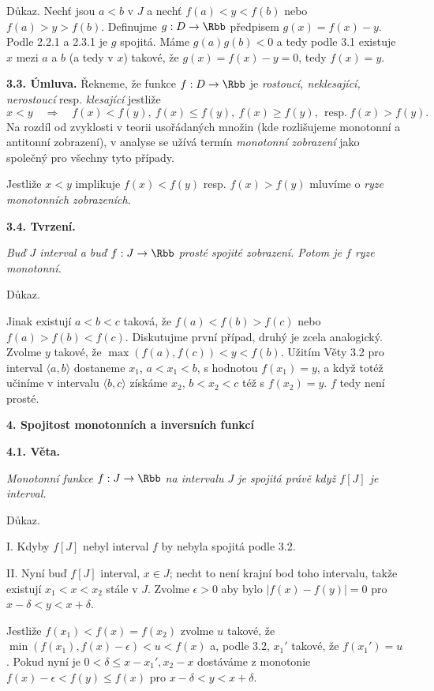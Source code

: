 \documentclass[12pt]{article}
\begin{document}
{{ Důkaz.} Nechť jsou $a<b$ v $J$ a nechť $f(a)<y<f(b)$ nebo $f(a)>y>f(b)$. Definujme  $g:D\to \Rbb$ předpisem $g(x)=f(x)-y$. Podle 2.2.1 a 2.3.1 je $g$ spojitá. Máme $g(a)g(b)<0$ a tedy podle 3.1 existuje $x$ mezi $a$ a $b$ (a
tedy v $x$)
 takové, že $g(x)=f(x)-y=0$, tedy $f(x)=y$. \sq
 
 \bigskip
 
 {\bf 3.3. Úmluva.} \v Rekneme, \v ze funkce $f:D\to\Rbb$ je {\em rostoucí, neklesající, nerostoucí} resp. {\em klesající} jestliže
 $$
 x<y\quad{\Rightarrow}\quad f(x)<f(y),\ f(x)\leq f(y), \ f(x)\geq f(y),\   \ \text{resp.}\ 
 f(x)>f(y).
 $$
 Na rozdíl od zvyklosti v teorii usořádaných množin (kde rozlišujeme monotonní a antitonní zobrazení), v analyse
se užívá termín {\em monotonní zobrazení} jako společný pro všechny tyto případy.
 
 Jestliže $x<y$ implikuje $f(x)<f(y)$ resp. $f(x)>f(y)$ mluvíme o {\em ryze monotonních zobrazeních}.
 
 \bigskip
 
 {\bf 3.4. Tvrzení.} {\em Buď $J$  interval a buď $f:J\to\Rbb$ prosté spojité zobrazení. Potom je $f$ ryze monotonní.
 
 Důkaz.} Jinak existují $a<b<c$ taková, že $f(a)<f(b)> f(c)$ nebo 
 $f(a)>f(b)< f(c)$. Diskutujme první případ, druhý je zcela analogický.
 Zvolme $y$ takové, že $\max(f(a),f(c))< y<f(b)$. Užitím Věty 3.2 pro interval $\langle a,b \rangle$ dostaneme $x_1$, $a<x_1<b$, s hodnotou $f(x_1)=y$, a když totéž učiníme v intervalu
  $\langle b,c \rangle$ získáme $x_2$, $b<x_2<c$ též s $f(x_2)=y$. $f$ tedy není prosté. \sq 
 
 
 
 \vskip10mm
 
 {\large\bf 4. Spojitost monotonních a inversních funkcí}
 
 \bigskip
 
 {\bf 4.1. Věta.} 
 {\em  Monotonní funkce $f:J\to \Rbb$ na intervalu $J$ 
je spojitá právě když $f[J]$ je interval.
 
 Důkaz.} I. Kdyby $f[J]$ nebyl interval $f$ by nebyla spojitá podle 3.2.
 
 II. Nyní buď $f[J]$ interval,  $x\in J$; necht to není krajní bod toho intervalu, takže existují $x_1<x<x_2$ stále v $J$. Zvolme $\epsilon>0$
 aby bylo
 $|f(x)-f(y)|=0$ pro $x-\delta<y<x+\delta$.
 
 Jestliže $f(x_1)<f(x)=f(x_2)$ zvolme $u$ takové, že $\min(f(x_1),f(x)-\epsilon)<u<f(x)$  a, podle 3.2, $x_1'$ takové, že $f(x_1')=u$. 
 Pokud nyní je $0<\delta\leq x-x_1',x_2-x$ dostáváme z monotonie
 $f(x)-\epsilon<f(y)\leq f(x)$ pro $x-\delta<y<x+\delta$.
 
}
\end{document}
